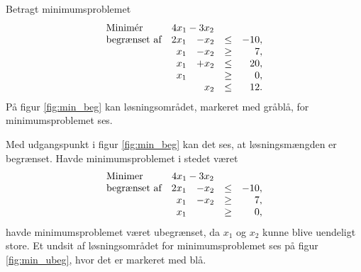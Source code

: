 \begin{eks}
\label{eks:min_lin}
Betragt minimumsproblemet
%
\begin{align*}
\begin{array}{lrrlr}
\text{Minimér}		&	\multicolumn{2}{c}{4x_1-3x_2}  &\\
\text{begrænset af}	&2x_1& - x_2			&\leq 	&-10,\\
					&x_1& - x_2				&\geq	& 7,\\
					&x_1& + x_2				&\leq	& 20,\\
					&x_1&					&\geq	& 0,\\
					& &x_2					&\leq	& 12.
\end{array}
\end{align*}
%
På figur \ref{fig:min_beg} kan løsningsområdet, markeret med gråblå, for minimumsproblemet ses.
%

\noindent
%
Med udgangspunkt i figur \ref{fig:min_beg} kan det ses, at løsningsmængden er begrænset.
% 
Havde minimumsproblemet i stedet været 
%
\begin{align*}
\begin{array}{lrrlr}
\text{Minimer}		&\multicolumn{2}{c}{4x_1-3x_2}  &\\
\text{begrænset af}	&2x_1& - x_2			&\leq 	&-10,\\
					&x_1& - x_2				&\geq	& 7,\\
					&x_1&					&\geq	& 0,
\end{array}
\end{align*}
havde minimumsproblemet været ubegrænset, da $x_1$ og $x_2$ kunne blive uendeligt store. 
Et undsit af løsningsområdet for minimumsproblemet ses på figur \ref{fig:min_ubeg}, hvor det er markeret med blå.
%

%
\end{eks}